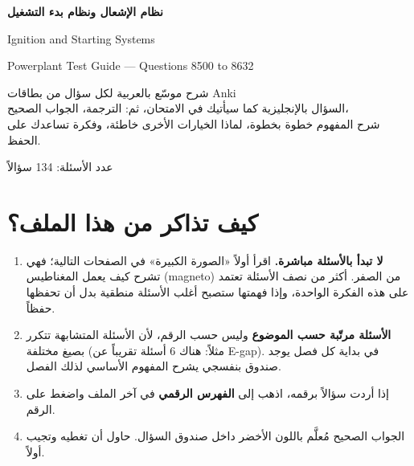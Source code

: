 \documentclass[11pt,a4paper]{article}
\newcommand{\en}[1]{\textenglish{#1}}
\begin{document}
\begin{titlepage}
\centering
\vspace*{2cm}
{\Huge\bfseries\textcolor{qframe}{نظام الإشعال ونظام بدء التشغيل}\par}
\vspace{0.6cm}
{\LARGE\en{Ignition and Starting Systems}\par}
\vspace{0.4cm}
{\large\en{Powerplant Test Guide — Questions 8500 to 8632}\par}
\vspace{1.5cm}
\begin{tcolorbox}[colback=qback,colframe=qframe,width=0.85\linewidth,arc=2mm]
\centering
شرح موسّع بالعربية لكل سؤال من بطاقات \en{Anki}\\[4pt]
السؤال بالإنجليزية كما سيأتيك في الامتحان، ثم: الترجمة، الجواب الصحيح،\\
شرح المفهوم خطوة بخطوة، لماذا الخيارات الأخرى خاطئة، وفكرة تساعدك على الحفظ.
\end{tcolorbox}
\vfill
{\large عدد الأسئلة: 134 سؤالاً}
\end{titlepage}

\tableofcontents
\newpage

\section*{كيف تذاكر من هذا الملف؟}

\begin{enumerate}[label=\arabic*.]
  \item \textbf{لا تبدأ بالأسئلة مباشرة.} اقرأ أولاً «الصورة الكبيرة» في الصفحات التالية؛ فهي تشرح كيف يعمل المغناطيس (\en{magneto}) من الصفر. أكثر من نصف الأسئلة تعتمد على هذه الفكرة الواحدة، وإذا فهمتها ستصبح أغلب الأسئلة منطقية بدل أن تحفظها حفظاً.
  \item \textbf{الأسئلة مرتّبة حسب الموضوع} وليس حسب الرقم، لأن الأسئلة المتشابهة تتكرر بصيغ مختلفة (مثلاً: هناك 6 أسئلة تقريباً عن \en{E-gap}). في بداية كل فصل يوجد صندوق بنفسجي يشرح المفهوم الأساسي لذلك الفصل.
  \item إذا أردت سؤالاً برقمه، اذهب إلى \textbf{الفهرس الرقمي} في آخر الملف واضغط على الرقم.
  \item الجواب الصحيح مُعلَّم باللون الأخضر داخل صندوق السؤال. حاول أن تغطيه وتجيب أولاً.
\end{enumerate}
\end{document}

